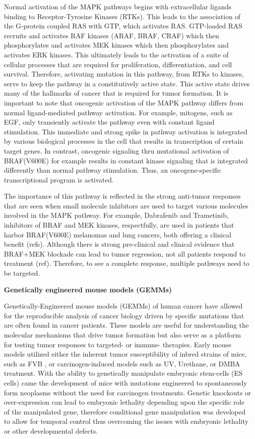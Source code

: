 Normal activation of the MAPK pathways begins with extracellular ligands binding to Receptor-Tyrosine Kinases (RTKs). This leads to the association of the G-protein coupled RAS with GTP, which activates RAS. GTP-loaded RAS recruits and activates RAF kinases (ARAF, BRAF, CRAF) which then phosphorylates and activates MEK kinases which then phosphorylates and activates ERK kinases. This ultimately leads to the activation of a suite of cellular processes that are required for proliferation, differentiation, and cell survival. Therefore, activating mutation in this pathway, from RTKs to kinases, serve to keep the pathway in a constitutively active state. This active state drives many of the hallmarks of cancer that is required for tumor formation. It is important to note that oncogenic activation of the MAPK pathway differs from normal ligand-mediated pathway activation. For example, mitogens, such as EGF, only transiently activate the pathway even with constant ligand stimulation. This immediate and strong spike in pathway activation is integrated by various biological processes in the cell that results in transcription of certain target genes. In contrast, oncogenic signaling thru mutational activation of BRAF(V600E) for example results in constant kinase signaling that is integrated differently than normal pathway stimulation. Thus, an oncogene-specific transcriptional program is activated.

The importance of this pathway is reflected in the strong anti-tumor responses that are seen when small molecule inhibitors are used to target various molecules involved in the MAPK pathway. For example, Dabrafenib and Trametinib, inhibitors of BRAF and MEK kinases, respectfully, are used in patients that harbor BRAF(V600E) melanomas and lung cancers, both offering a clinical benefit (refs). Although there is strong pre-clinical and clinical evidence that BRAF+MEK blockade can lead to tumor regression, not all patients respond to treatment (ref). Therefore, to see a complete response, multiple pathways need to be targeted.

\textbf{Genetically engineered mouse models (GEMMs)}

Genetically-Engineered mouse models (GEMMs) of human cancer have allowed for the reproducible analysis of cancer biology driven by specific mutations that are often found in cancer patients. These models are useful for understanding the molecular mechanisms that drive tumor formation but also serve as a platform for testing tumor responses to targeted- or immune- therapies. Early mouse models utilized either the inherent tumor susceptibility of inbred strains of mice, such as FVB , or carcinogen-induced models such as UV, Urethane, or DMBA treatment. With the ability to genetically manipulate embryonic stem-cells (ES cells) came the development of mice with mutations engineered to spontaneously form neoplasms without the need for carcinogen treatments. Genetic knockouts or over-expression can lead to embryonic lethality depending upon the specific role of the manipulated gene, therefore conditional gene manipulation was developed to allow for temporal control thus overcoming the issues with embryonic lethality or other developmental defects.

